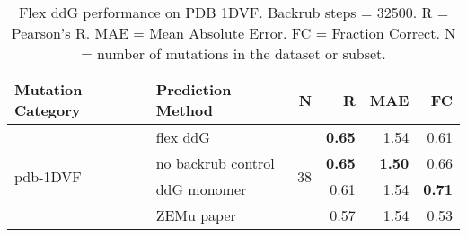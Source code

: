 \begin{table}
  \begin{tabular}{llrrrr}
\toprule
Mutation Category &   Prediction Method &   N &    R &  MAE &   FC \\
\midrule
 \multirow{ 4}{*}{pdb-1DVF} & flex ddG & \multirow{ 4}{*}{38} & \textbf{0.65} & 1.54 & 0.61  \\
 & no backrub control & & \textbf{0.65} & \textbf{1.50} & 0.66  \\
 & ddG monomer & & 0.61 & 1.54 & \textbf{0.71}  \\
 & ZEMu paper & & 0.57 & 1.54 & 0.53  \\
\bottomrule
\end{tabular}
  \caption[Flex ddG performance on PDB 1DVF]{
    Flex ddG performance on PDB 1DVF. Backrub steps = 32500. R = Pearson's R. MAE = Mean Absolute Error. FC = Fraction Correct. N = number of mutations in the dataset or subset.
  } \label{tab:table-pdb-1DVF}
\end{table}
